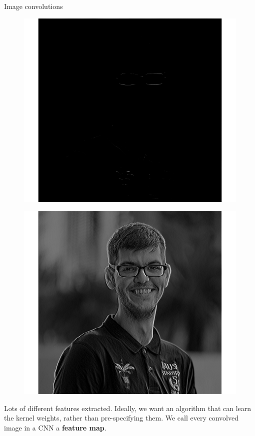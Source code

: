 \documentclass{beamer}
\begin{document}
\begin{frame}{Image convolutions}
\begin{minipage}{0.24\linewidth}
\end{minipage}
\begin{minipage}{0.24\linewidth}
\begin{figure}
\includegraphics[width=\linewidth]{Images/conv13.png}
\end{figure}

\end{minipage}
\begin{minipage}{0.24\linewidth}
\begin{figure}
\includegraphics[width=\linewidth]{Images/conv14.png}
\end{figure}

\end{minipage}
Lots of different features extracted. Ideally, we want an algorithm that can learn the kernel weights, rather than pre-specifying them. We call every convolved image in a CNN a \textbf{feature map}.
\end{frame}
\end{document}
